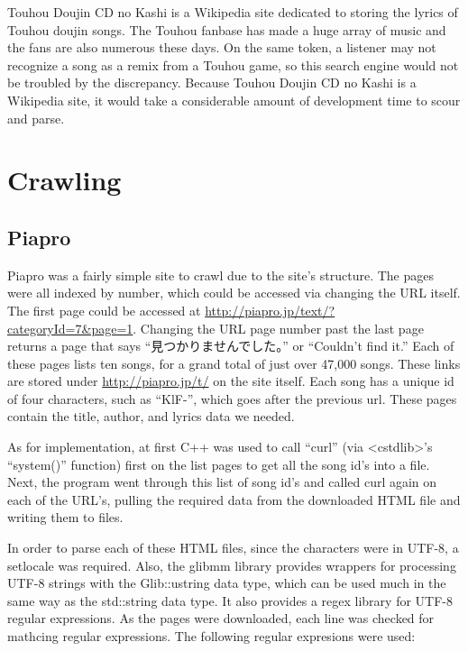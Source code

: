 \documentclass{acm} %
\begin{document}
\begin{CJK}{UTF8}{zhsong}
Touhou Doujin CD no Kashi is a Wikipedia site dedicated to storing the lyrics of Touhou doujin songs. The Touhou fanbase has made a huge array of music and the fans are also numerous these days. On the same token, a listener may not recognize a song as a remix from a Touhou game, so this search engine would not be troubled by the discrepancy. Because Touhou Doujin CD no Kashi is a Wikipedia site, it would take a considerable amount of development time to scour and parse.


\section{Crawling}

\subsection{Piapro}

Piapro was a fairly simple site to crawl due to the site's structure. The pages were all indexed by number, which could be accessed via changing the URL itself. The first page could be accessed at \url{http://piapro.jp/text/?categoryId=7\&page=1}. Changing the URL page number past the last page returns a page that says ``見つかりませんでした。'' or ``Couldn't find it.'' Each of these pages lists ten songs, for a grand total of just over 47,000 songs. These links are stored under \url{http://piapro.jp/t/} on the site itself. Each song has a unique id of four characters, such as ``KlF-'', which goes after the previous url. These pages contain the title, author, and lyrics data we needed.

As for implementation, at first C++ was used to call ``curl'' (via <cstdlib>'s ``system()'' function) first on the list pages to get all the song id's into a file. Next, the program went through this list of song id's and called curl again on each of the URL's, pulling the required data from the downloaded HTML file and writing them to files.

In order to parse each of these HTML files, since the characters were in UTF-8, a setlocale was required. Also, the glibmm library provides wrappers for processing UTF-8 strings with the Glib::ustring data type, which can be used much in the same way as the std::string data type. It also provides a regex library for UTF-8 regular expressions. As the pages were downloaded, each line was checked for mathcing regular expressions. The following regular expresions were used:


\end{CJK}
\end{document}
